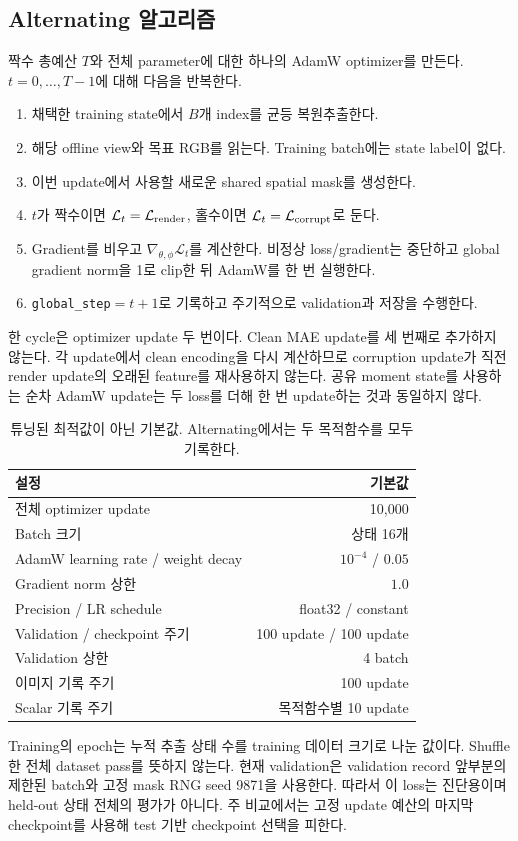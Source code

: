 \documentclass[11pt,a4paper]{article}
\newcommand{\code}[1]{\nolinkurl{#1}}
\newcommand{\Lc}{\mathcal{L}}
\begin{document}
\subsection{Alternating 알고리즘}
짝수 총예산 $T$와 전체 parameter에 대한 하나의 AdamW optimizer를 만든다.
$t=0,\ldots,T-1$에 대해 다음을 반복한다.
\begin{enumerate}
\item 채택한 training state에서 $B$개 index를 균등 복원추출한다.
\item 해당 offline view와 목표 RGB를 읽는다. Training batch에는 state label이 없다.
\item 이번 update에서 사용할 새로운 shared spatial mask를 생성한다.
\item $t$가 짝수이면 $\Lc_t=\Lc_{\rm render}$, 홀수이면 $\Lc_t=\Lc_{\rm corrupt}$로 둔다.
\item Gradient를 비우고 $\nabla_{\theta,\phi}\Lc_t$를 계산한다. 비정상 loss/gradient는
중단하고 global gradient norm을 1로 clip한 뒤 AdamW를 한 번 실행한다.
\item \code{global_step}$=t+1$로 기록하고 주기적으로 validation과 저장을 수행한다.
\end{enumerate}
한 cycle은 optimizer update 두 번이다. Clean MAE update를 세 번째로 추가하지 않는다.
각 update에서 clean encoding을 다시 계산하므로 corruption update가 직전 render
update의 오래된 feature를 재사용하지 않는다. 공유 moment state를 사용하는 순차
AdamW update는 두 loss를 더해 한 번 update하는 것과 동일하지 않다.

\begin{table}[htbp]\centering\small
\begin{tabular}{lr}
\toprule 설정 & 기본값 \\\midrule
전체 optimizer update & 10,000 \\
Batch 크기 & 상태 16개 \\
AdamW learning rate / weight decay & $10^{-4}$ / $0.05$ \\
Gradient norm 상한 & $1.0$ \\
Precision / LR schedule & float32 / constant \\
Validation / checkpoint 주기 & 100 update / 100 update \\
Validation 상한 & 4 batch \\
이미지 기록 주기 & 100 update \\
Scalar 기록 주기 & 목적함수별 10 update \\\bottomrule
\end{tabular}
\caption{튜닝된 최적값이 아닌 기본값. Alternating에서는 두 목적함수를 모두 기록한다.}
\end{table}
Training의 epoch는 누적 추출 상태 수를 training 데이터 크기로 나눈 값이다.
Shuffle한 전체 dataset pass를 뜻하지 않는다. 현재 validation은 validation
record 앞부분의 제한된 batch와 고정 mask RNG seed 9871을 사용한다. 따라서
이 loss는 진단용이며 held-out 상태 전체의 평가가 아니다. 주 비교에서는 고정
update 예산의 마지막 checkpoint를 사용해 test 기반 checkpoint 선택을 피한다.
\end{document}
